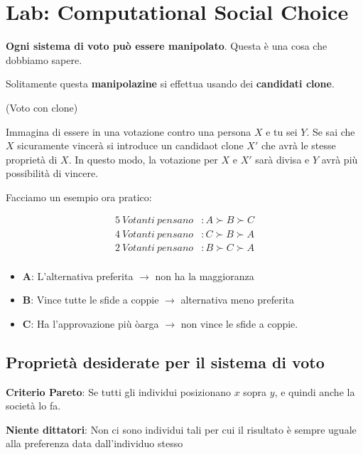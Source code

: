 \section{Lab: Computational Social Choice}

\textbf{Ogni sistema di voto può essere manipolato}. Questa è una cosa che dobbiamo sapere.

Solitamente questa \textbf{manipolazine} si effettua usando dei \textbf{candidati clone}.

\begin{esempio}
    (Voto con clone)

    Immagina di essere in una votazione contro una persona $X$ e tu sei $Y$. Se sai che $X$ sicuramente vincerà si introduce
    un candidaot clone $X'$ che avrà le stesse proprietà di $X$. In questo modo, la votazione per $X$ e $X'$ sarà divisa e 
    $Y$ avrà più possibilità di vincere.
\end{esempio}


Facciamo un esempio ora pratico:

\begin{equation}
    \begin{aligned}
        5 \ Votanti \ pensano &: A \succ B \succ C \\
        4 \ Votanti \ pensano &: C \succ B \succ A \\
        2 \ Votanti \ pensano &: B \succ C \succ A \\
    \end{aligned}
\end{equation}

\begin{itemize}
    \item \textbf{A}: L'alternativa preferita $\rightarrow$ non ha la maggioranza
    \item \textbf{B}: Vince tutte le sfide a coppie $\rightarrow$ alternativa meno preferita
    \item \textbf{C}: Ha l'approvazione più òarga $\rightarrow$ non vince le sfide a coppie.
\end{itemize}


\subsection{Proprietà desiderate per il sistema di voto}

\textbf{Criterio Pareto}: Se tutti gli individui posizionano $x$ sopra $y$, e quindi anche la società lo fa.

\textbf{Niente dittatori}: Non ci sono individui tali per cui il risultato è sempre uguale alla preferenza data dall'individuo stesso

